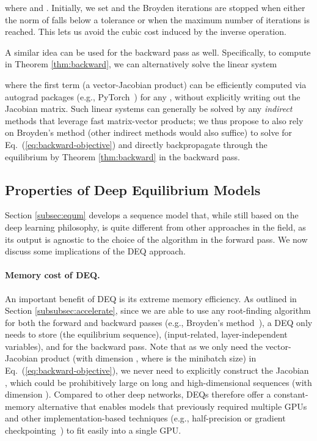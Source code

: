 \documentclass{article}
\begin{document}
where  and . Initially, we set  and the Broyden iterations are stopped when either the norm of  falls below a tolerance  or when the maximum number of iterations is reached. This lets us avoid the cubic cost induced by the inverse operation.

A similar idea can be used for the backward pass as well. Specifically, to compute  in Theorem \ref{thm:backward}, we can alternatively solve the linear system

where the first term (a vector-Jacobian product) can be efficiently computed via autograd packages (e.g., PyTorch~\cite{Steiner2019}) for any , without explicitly writing out the Jacobian matrix. Such linear systems can generally be solved by any \emph{indirect} methods that leverage fast matrix-vector products; we thus propose to also rely on Broyden's method (other indirect methods would also suffice) to solve for Eq.~(\ref{eq:backward-objective}) and directly backpropagate through the equilibrium by Theorem \ref{thm:backward} in the backward pass.

\subsection{Properties of Deep Equilibrium Models}
\label{subsec:deq-discussion}

Section \ref{subsec:equm} develops a sequence model that, while still based on the deep learning philosophy, is quite different from other approaches in the field, as its output is agnostic to the choice of the  algorithm in the forward pass. We now discuss some implications of the DEQ approach.

\vspace{-2mm}

\paragraph{Memory cost of DEQ.} An important benefit of DEQ is its extreme memory efficiency. As outlined in Section \ref{subsubsec:accelerate}, since we are able to use any root-finding algorithm for both the forward and backward passes (e.g., Broyden's method~\citep{broyden1965class}), a DEQ only needs to store  (the equilibrium sequence),  (input-related, layer-independent variables), and  for the backward pass. Note that as we only need the vector-Jacobian product (with dimension , where  is the minibatch size) in Eq.~(\ref{eq:backward-objective}), we never need to explicitly construct the Jacobian , which could be prohibitively large on long and high-dimensional sequences (with dimension ). Compared to other deep networks, DEQs therefore offer a constant-memory alternative that enables models that previously required multiple GPUs and other implementation-based techniques (e.g., half-precision or gradient checkpointing~\citep{chen2016training,child2019generating}) to fit easily into a single GPU.
\vspace{-2mm}
\end{document}
